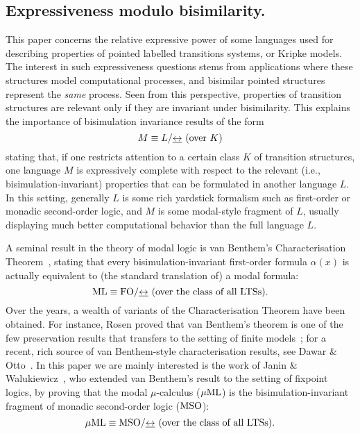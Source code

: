 
\subsection{Expressiveness modulo bisimilarity.}
%
This paper concerns the relative expressive power of some languages used for
describing properties of pointed labelled transitions systems, or Kripke
models.
The interest in such expressiveness questions stems from applications where
these structures model computational processes, and bisimilar pointed
structures represent the \emph{same} process.
Seen from this perspective, properties of transition structures are relevant
only if they are invariant under bisimilarity.
This explains the importance of bisimulation invariance results of the form
\begin{equation*}
M \equiv L / {\bis} \text{ (over $K$)}
\end{equation*}
stating that,  if one restricts attention to a certain class $K$ of transition
structures, one language $M$ is expressively complete with respect to the
relevant (i.e., bisimulation-invariant) properties that can be formulated in
another language $L$.
In this setting, generally $L$ is some rich yardstick formalism such as
first-order or monadic second-order logic, and $M$ is some modal-style
fragment of $L$, usually displaying much better computational behavior
than the full language $L$.

A seminal result in the theory of modal logic is van Benthem's Characterisation
Theorem~\cite{vanBenthemPhD}, stating that every bisimulation-invariant
first-order formula $\alpha(x)$ is actually equivalent to (the standard
translation of) a modal formula:
\begin{equation*}
\ML \equiv \fo/{\bis} \text{ (over the class of all LTSs)}.
\end{equation*}
Over the years, a wealth of variants of the Characterisation Theorem have been
obtained.
For instance, Rosen proved that van Benthem's theorem is one of the few
preservation results that transfers to the setting of finite
models~\cite{rose:moda97}; for a recent, rich source of van Benthem-style
characterisation results, see Dawar \& Otto~\cite{DawarO09}.
In this paper we are mainly interested is the work of Janin \&
Walukiewicz~\cite{Jan96}, who extended van Benthem's result to the setting
of fixpoint logics, by proving that the modal $\mu$-calculus ($\mu\mathrm{ML}$) is the
bisimulation-invariant fragment of monadic second-order
logic ($\mathrm{MSO}$):
\begin{equation*}
\MC \equiv \mso/{\bis} \text{ (over the class of all LTSs)}.
\end{equation*}

